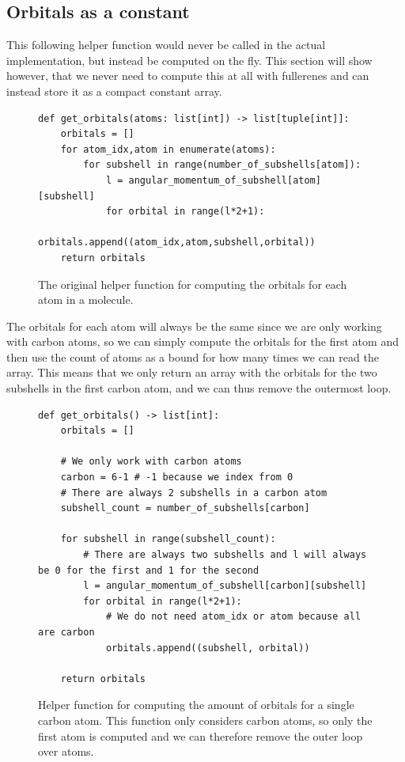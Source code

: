 \subsection{Orbitals as a constant}

This following helper function would never be called in the actual implementation, but instead be computed on the fly. This section will show however, that we never need to compute this at all with fullerenes and can instead store it as a compact constant array. 

\begin{figure}[H]
\begin{verbatim}
def get_orbitals(atoms: list[int]) -> list[tuple[int]]:
    orbitals = []
    for atom_idx,atom in enumerate(atoms):
        for subshell in range(number_of_subshells[atom]):
            l = angular_momentum_of_subshell[atom][subshell] 
            for orbital in range(l*2+1):
                orbitals.append((atom_idx,atom,subshell,orbital))
    return orbitals
\end{verbatim}
\caption{The original helper function for computing the orbitals for each atom in a molecule.}
\end{figure}

The orbitals for each atom will always be the same since we are only working with carbon atoms, so we can simply compute the orbitals for the first atom and then use the count of atoms as a bound for how many times we can read the array. This means that we only return an array with the orbitals for the two subshells in the first carbon atom, and we can thus remove the outermost loop.

\begin{figure}[H]
\begin{verbatim}
def get_orbitals() -> list[int]:
    orbitals = []

    # We only work with carbon atoms
    carbon = 6-1 # -1 because we index from 0
    # There are always 2 subshells in a carbon atom
    subshell_count = number_of_subshells[carbon]

    for subshell in range(subshell_count):
        # There are always two subshells and l will always be 0 for the first and 1 for the second
        l = angular_momentum_of_subshell[carbon][subshell]
        for orbital in range(l*2+1):
            # We do not need atom_idx or atom because all are carbon
            orbitals.append((subshell, orbital))

    return orbitals
\end{verbatim}
\caption{Helper function for computing the amount of orbitals for a single carbon atom. This function only considers carbon atoms, so only the first atom is computed and we can therefore remove the outer loop over atoms.}
\end{figure}

